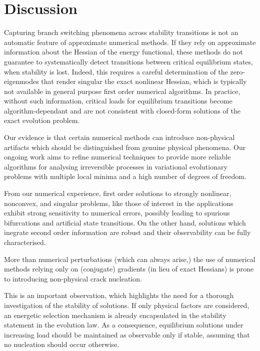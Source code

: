 
\section{Discussion} 

    Capturing branch switching phenomena across stability transitions is not an automatic feature of approximate numerical methods. If they rely on approximate information about the Hessian of the energy functional, these methods do not guarantee to systematically detect transitions between critical equilibrium states, when stability is lost. 
Indeed, this requires a careful determination of the zero-eigenmodes that render singular the exact nonlinear Hessian, which is typically not available in general purpose first order numerical algorithms.
In practice, without such information, critical loads for equilibrium transitions become algorithm-dependant and are not consistent with closed-form solutions of the exact evolution problem.
% 

Our evidence is that certain numerical methods can introduce non-physical artifacts which should be distinguished from genuine physical phenomena. Our ongoing work aims to refine numerical techniques to provide more reliable algorithms for analysing irreversible processes in variational evolutionary problems with multiple local minima and a high number of degrees of freedom.

From our numerical experience, first order solutions to strongly nonlinear, nonconvex, and singular problems, like those of interest in the applications exhibit strong sensitivity to numerical errors, possibly leading to spurious bifurcations and artificial state transitions. On the other hand, solutions which inegrate second order information are robust and their observability can be fully characterised.

More than numerical perturbations (which can always arise,) the use of numerical methods relying only on (conjugate) gradients (in lieu of exact Hessians) is prone to introducing non-physical crack nucleation.

This is an important observation, which highlights the need for a thorough investigation of the stability of solutions. 
If only physical factors are considered, an energetic selection mechanism is already encapsulated in the stability statement in the evolution law. As a consequence, equilibrium solutions under increasing load should be maintained as observable only if stable, assuming that no nucleation should occur otherwise.

